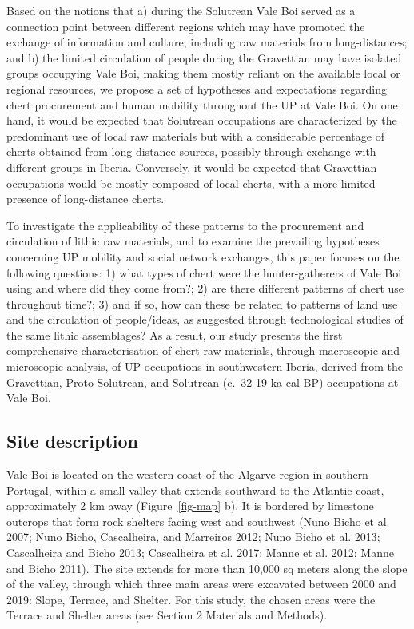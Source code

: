 \documentclass[
  a4paper,
  DIV=11,
  numbers=noendperiod]{scrreprt}
\begin{document}
Based on the notions that a) during the Solutrean Vale Boi served as a
connection point between different regions which may have promoted the
exchange of information and culture, including raw materials from
long-distances; and b) the limited circulation of people during the
Gravettian may have isolated groups occupying Vale Boi, making them
mostly reliant on the available local or regional resources, we propose
a set of hypotheses and expectations regarding chert procurement and
human mobility throughout the UP at Vale Boi. On one hand, it would be
expected that Solutrean occupations are characterized by the predominant
use of local raw materials but with a considerable percentage of cherts
obtained from long-distance sources, possibly through exchange with
different groups in Iberia. Conversely, it would be expected that
Gravettian occupations would be mostly composed of local cherts, with a
more limited presence of long-distance cherts.

To investigate the applicability of these patterns to the procurement
and circulation of lithic raw materials, and to examine the prevailing
hypotheses concerning UP mobility and social network exchanges, this
paper focuses on the following questions: 1) what types of chert were
the hunter-gatherers of Vale Boi using and where did they come from?; 2)
are there different patterns of chert use throughout time?; 3) and if
so, how can these be related to patterns of land use and the circulation
of people/ideas, as suggested through technological studies of the same
lithic assemblages? As a result, our study presents the first
comprehensive characterisation of chert raw materials, through
macroscopic and microscopic analysis, of UP occupations in southwestern
Iberia, derived from the Gravettian, Proto-Solutrean, and Solutrean
(c.~32-19 ka cal BP) occupations at Vale Boi.

\subsection{Site description}\label{site-description}

Vale Boi is located on the western coast of the Algarve region in
southern Portugal, within a small valley that extends southward to the
Atlantic coast, approximately 2 km away (Figure~\ref{fig-map} b). It is
bordered by limestone outcrops that form rock shelters facing west and
southwest (Nuno Bicho et al. 2007; Nuno Bicho, Cascalheira, and
Marreiros 2012; Nuno Bicho et al. 2013; Cascalheira and Bicho 2013;
Cascalheira et al. 2017; Manne et al. 2012; Manne and Bicho 2011). The
site extends for more than 10,000 sq meters along the slope of the
valley, through which three main areas were excavated between 2000 and
2019: Slope, Terrace, and Shelter. For this study, the chosen areas were
the Terrace and Shelter areas (see Section 2 Materials and Methods).
\end{document}
